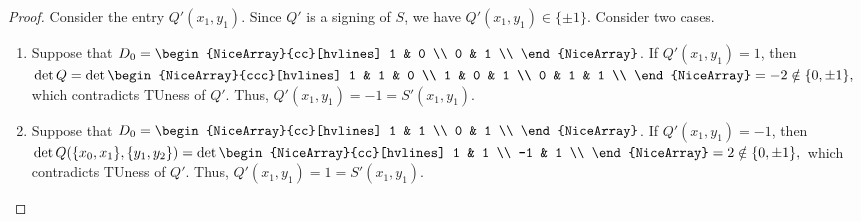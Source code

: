 \begin{proof}
    Consider the entry $Q' (x_{1}, y_{1})$. Since $Q'$ is a signing of $S$, we have $Q' (x_{1}, y_{1}) \in \{\pm 1\}$. Consider two cases.
    \begin{enumerate}
        \item Suppose that $D_{0} = \begin{NiceArray}{cc}[hvlines] 1 & 0 \\ 0 & 1 \\ \end{NiceArray}$. If $Q' (x_{1}, y_{1}) = 1$, then
        $
            \det Q = \det \begin{NiceArray}{ccc}[hvlines]
                1 & 1 & 0 \\
                1 & 0 & 1 \\
                0 & 1 & 1 \\
            \end{NiceArray} = -2 \notin \{0, \pm 1\},
        $
        which contradicts TUness of $Q'$. Thus, $Q' (x_{1}, y_{1}) = -1 = S' (x_{1}, y_{1})$.
        \item Suppose that $D_{0} = \begin{NiceArray}{cc}[hvlines] 1 & 1 \\ 0 & 1 \\ \end{NiceArray}$. If $Q' (x_{1}, y_{1}) = -1$, then
        $
            \det Q (\{x_{0}, x_{1}\}, \{y_{1}, y_{2}\}) = \det \begin{NiceArray}{cc}[hvlines]
                1 & 1 \\
                -1 & 1 \\
            \end{NiceArray} = 2 \notin \{0, \pm 1\},
        $
        which contradicts TUness of $Q'$. Thus, $Q' (x_{1}, y_{1}) = 1 = S' (x_{1}, y_{1})$.
    \end{enumerate}
\end{proof}

